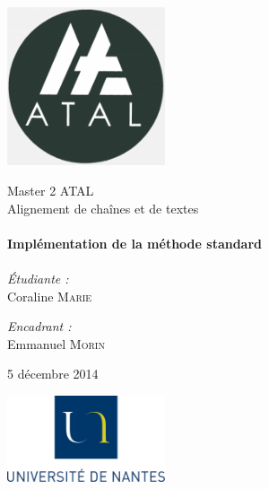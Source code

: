 
\begin{titlepage}
	\begin{center}

		\includegraphics[width=0.35\textwidth]{Figures/ATAL.png}~

		\LARGE{Master 2 \textsc{ATAL}}\\[1.5cm]

		\Large{Alignement de chaînes et de textes}\\[0.5cm]

		\HRule \\[0.4cm]
		{ \huge \bfseries Implémentation de la méthode standard \\[0.4cm] }
		\HRule \\[1.5cm]

		\normalsize		
		\emph{\'Etudiante :}\\
		Coraline \textsc{Marie}

		\vspace{0.5cm}

		\emph{Encadrant :} \\
		Emmanuel \textsc{Morin}

		\vspace{1cm}

		{\large 5 décembre 2014}

		\vfill

		
		\includegraphics[width=0.35\textwidth]{Figures/logoUN.png}~\\[2cm]

		

	\end{center}
\end{titlepage}
